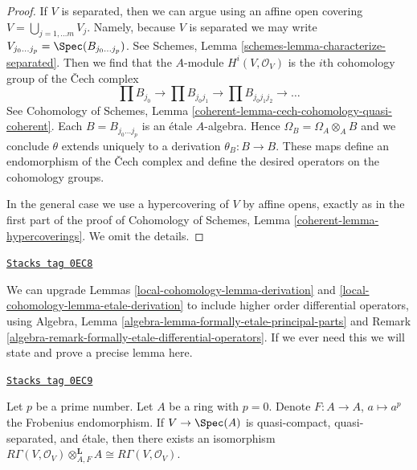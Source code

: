 \begin{proof}
If $V$ is separated, then we can argue using an affine open covering
$V = \bigcup_{j = 1, \ldots m} V_j$. Namely, because $V$ is separated
we may write $V_{j_0 \ldots j_p} = \Spec(B_{j_0 \ldots j_p})$.
See Schemes, Lemma \ref{schemes-lemma-characterize-separated}. Then we
find that the $A$-module $H^i(V, \mathcal{O}_V)$
is the $i$th cohomology group of the {\v C}ech complex
$$
\prod B_{j_0} \to
\prod B_{j_0j_1} \to
\prod B_{j_0j_1j_2} \to \ldots
$$
See Cohomology of Schemes, Lemma
\ref{coherent-lemma-cech-cohomology-quasi-coherent}.
Each $B = B_{j_0 \ldots j_p}$ is an \'etale $A$-algebra.
Hence $\Omega_B = \Omega_A \otimes_A B$ and we conclude
$\theta$ extends uniquely to a derivation $\theta_B : B \to B$.
These maps define an endomorphism of the {\v C}ech complex
and define the desired operators on the cohomology groups.

\medskip\noindent
In the general case we use a hypercovering of $V$ by
affine opens, exactly as in the first part of the proof of
Cohomology of Schemes, Lemma \ref{coherent-lemma-hypercoverings}.
We omit the details.
\end{proof}

\begin{remark}
\label{local-cohomology-remark-higher-order-operators}
\href{https://stacks.math.columbia.edu/tag/0EC8}{\texttt{Stacks tag 0EC8}}

We can upgrade Lemmas \ref{local-cohomology-lemma-derivation} and \ref{local-cohomology-lemma-etale-derivation}
to include higher order differential operators, using
Algebra, Lemma \ref{algebra-lemma-formally-etale-principal-parts} and
Remark \ref{algebra-remark-formally-etale-differential-operators}.
If we ever need this we will state and prove a
precise lemma here.
\end{remark}

\begin{lemma}
\label{local-cohomology-lemma-etale-frobenius}
\href{https://stacks.math.columbia.edu/tag/0EC9}{\texttt{Stacks tag 0EC9}}

Let $p$ be a prime number. Let $A$ be a ring with $p = 0$.
Denote $F : A \to A$, $a \mapsto a^p$ the Frobenius endomorphism.
If $V \to \Spec(A)$ is quasi-compact, quasi-separated,
and \'etale, then there exists an isomorphism
$R\Gamma(V, \mathcal{O}_V) \otimes_{A, F}^\mathbf{L} A \cong
R\Gamma(V, \mathcal{O}_V)$.
\end{lemma}

